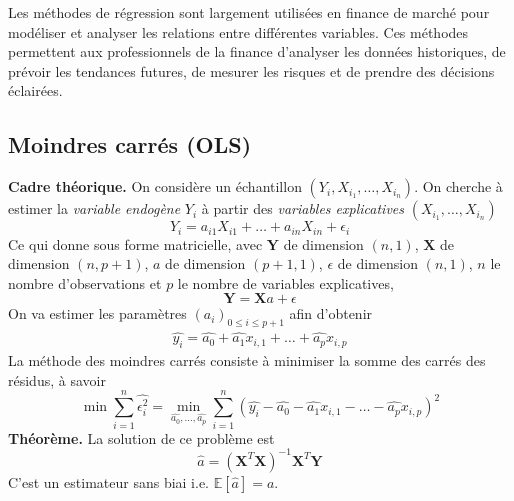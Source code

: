 \documentclass[a4paper]{article}
\begin{document}
 Les méthodes de régression sont largement utilisées en finance de marché pour modéliser et analyser les relations entre différentes variables. Ces méthodes permettent aux professionnels de la finance d'analyser les données historiques, de prévoir les tendances futures, de mesurer les risques et de prendre des décisions éclairées.
 \subsection{Moindres carrés (OLS)}
 \textbf{Cadre théorique.} On considère un échantillon $(Y_i, X_{i_1}, \dots , X_{i_n})$. On cherche à estimer la \textit{variable endogène}  $Y_i$ à partir des \textit{variables explicatives} $(X_{i_1}, \dots , X_{i_n})$
 \begin{equation}
     Y_i = a_{i1}X_{i1} + \dots + a_{in}X_{in} + \epsilon_i
 \end{equation}
 Ce qui donne sous forme matricielle, avec $\textbf{Y}$ de dimension $(n,1)$, $\textbf{X}$ de dimension $(n,p+1)$, $a$ de dimension $(p+1,1)$, $\epsilon$ de dimension $(n,1)$, $n$ le nombre d'observations et $p$ le nombre de variables explicatives,
 \begin{equation}
     \textbf{Y} = \textbf{X} a + \epsilon
 \end{equation}
On va estimer les paramètres $(a_i)_{0\leq i \leq p+1}$ afin d'obtenir
\begin{align*}
    \hat{y_i} = \hat{a_0} + \hat{a_1}x_{i,1} + \dots + \hat{a_p}x_{i,p}
\end{align*}
La méthode des moindres carrés consiste à minimiser la somme des carrés des résidus, à savoir
\begin{equation}
    \min \sum_{i=1}^{n} \hat{\epsilon_i^2} = \min_{\hat{a_0}, \dots, \hat{a_p}} \sum_{i=1}^{n} (\hat{y_i} - \hat{a_0} - \hat{a_1}x_{i,1} - \dots - \hat{a_p}x_{i,p})^2
\end{equation}
\textbf{Théorème.} La solution de ce problème est
\begin{equation}
    \hat{a} = (\textbf{X}^T \textbf{X})^{-1} \textbf{X}^T \textbf{Y}
\end{equation}
C'est un estimateur sans biai i.e. $\mathbb{E}[\hat{a}]=a$.
\end{document}

